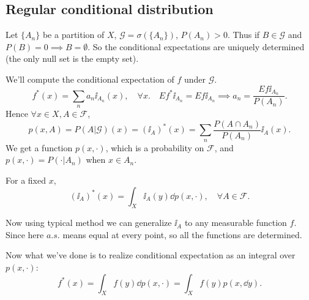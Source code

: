 \subsection{Regular conditional distribution}
\label{sub:Regular conditional distribution}
Let $\{A_n\}$ be a partition of $X$, $\mathscr{G} = \sigma(\{A_n\})$,
$P(A_n) > 0$. Thus if $B\in \mathscr{G}$ and $P(B) = 0 \implies B = \emptyset$.
So the conditional expectations are uniquely determined
(the only null set is the empty set).

We'll compute the conditional expectation of $f$ under $\mathscr{G}$.
\[
f^*(x) = \sum_{n} a_n\ii_{A_n}(x), \quad \forall x.\quad
Ef^*\ii_{A_n} = Ef\ii_{A_n} \implies a_n = \frac{Ef\ii_{A_n}}{P(A_n)}.
\]
Hence $\forall x\in X, A\in \mathscr{F}$,
\[
p(x, A) = P(A|\mathscr{G})(x) = (\ii_A)^*(x)
= \sum_{n} \frac{P(A\cap A_n)}{P(A_n)} \ii_A(x).
\]
We get a function $p(x, \cdot)$, which is a probability on $\mathscr{F}$,
and $p(x, \cdot) = P(\cdot | A_n)$ when $x\in A_n$.

For a fixed $x$,
\[
	(\ii_A)^*(x) = \int_X \ii_A(y) \dd p(x,\cdot), \quad \forall A\in \mathscr{F}.
\]

Now using typical method we can generalize $\ii_A$ to any measurable function $f$.
Since here $a.s.$ means equal at every point, so all the functions are determined.

Now what we've done is to realize conditional expectation as an integral over
 $p(x, \cdot)$:
\[
f^*(x) = \int_X f(y) \dd p(x, \cdot) = \int_X f(y)p(x, \dd y).
\]
